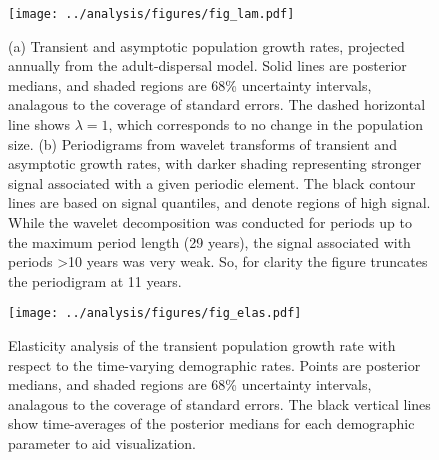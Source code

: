 \documentclass[11pt]{article}
\begin{document}
\clearpage
\begin{figure}
\centering
\texttt{[image: ../analysis/figures/fig\_lam.pdf]}
\caption{\label{fig:lam}
(a) Transient and asymptotic population growth rates,
projected annually from the adult-dispersal model.
Solid lines are posterior medians,
and shaded regions are 68\% uncertainty intervals, 
analagous to the coverage of standard errors.
The dashed horizontal line shows $\lambda=1$, 
which corresponds to no change in the population size.
(b) Periodigrams from wavelet transforms of transient and asymptotic growth rates,
with darker shading representing stronger signal associated with a given periodic element.
The black contour lines are based on signal quantiles, and denote regions of high signal.
While the wavelet decomposition was conducted for periods up to the maximum period length
(29 years), the signal associated with periods >10 years was very weak. 
So, for clarity the figure truncates the periodigram at 11 years.
}
\end{figure}
\clearpage

\clearpage
\begin{figure}
\centering
\texttt{[image: ../analysis/figures/fig\_elas.pdf]}
\caption{\label{fig:elas}
Elasticity analysis of the transient population growth rate 
with respect to the time-varying demographic rates.
Points are posterior medians,
and shaded regions are 68\% uncertainty intervals, 
analagous to the coverage of standard errors.
The black vertical lines show time-averages of the posterior medians 
for each demographic parameter to aid visualization.
}
\end{figure}
\clearpage





\renewcommand{\thefigure}{A\arabic{figure}}
\renewcommand{\theequation}{A\arabic{equation}}
\renewcommand{\thetable}{A\arabic{table}}
\setcounter{equation}{0}
\setcounter{figure}{0}
\setcounter{table}{0}
\end{document}

